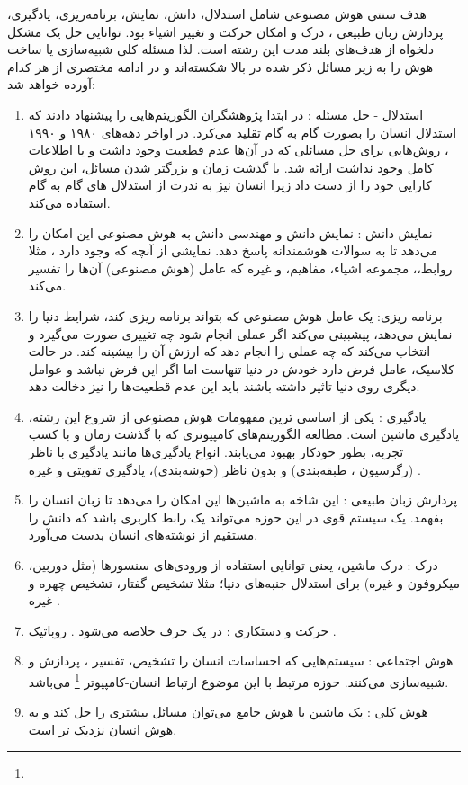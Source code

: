 \documentclass[a4paper, 12pt]{article}
\begin{document}
   
   هدف سنتی هوش مصنوعی شامل استدلال، دانش، نمایش، برنامه‌ریزی، یادگیری، پردازش زبان طبیعی ، درک و امکان حرکت و تغییر اشیاء بود. توانایی حل یک مشکل دلخواه از هدف‌های بلند مدت این رشته است. لذا مسئله کلی شبیه‌سازی یا ساخت هوش را به زیر مسائل ذکر شده در بالا شکسته‌اند و در ادامه مختصری از هر کدام آورده خواهد شد:
   \begin{enumerate}
   	\item
   	استدلال - حل مسئله :
   	در ابتدا پژوهشگران الگوریتم‌هایی را پیشنهاد دادند که استدلال انسان را بصورت گام به گام تقلید می‌کرد. در اواخر دهه‌های ۱۹۸۰ و ۱۹۹۰ ، روش‌هایی برای حل مسائلی که در آن‌ها عدم قطعیت وجود داشت و یا اطلاعات کامل وجود نداشت ارائه شد.  با گذشت زمان و بزرگتر شدن مسائل، این روش کارایی خود را از دست داد زیرا انسان نیز به ندرت از استدلال های گام به گام استفاده می‌کند.
   	\item
   	نمایش دانش :
   	نمایش دانش و مهندسی دانش به هوش مصنوعی این امکان را می‌دهد تا به سوالات هوشمندانه پاسخ دهد. نمایشی از آنچه که وجود دارد ، مثلا روابط،، مجموعه اشیاء، مفاهیم، و غیره که عامل (هوش مصنوعی)  آن‌ها را تفسیر می‌کند. 
   	
   	\item
   	برنامه ریزی:
   	یک عامل هوش مصنوعی که بتواند برنامه ریزی کند، شرایط دنیا را نمایش می‌دهد، پیشبینی می‌کند اگر عملی انجام شود چه تغییری صورت می‌گیرد و انتخاب می‌کند که چه عملی را انجام دهد که ارزش آن را بیشینه کند. در حالت کلاسیک، عامل فرض دارد خودش در دنیا تنهاست اما اگر این فرض نباشد و عوامل دیگری روی دنیا تاثیر داشته باشند باید این عدم قطعیت‌ها را نیز دخالت دهد. 
   	
   	\item
   	یادگیری :
   	یکی از اساسی ترین مفهومات هوش مصنوعی از شروع این رشته، یادگیری ماشین است. مطالعه الگوریتم‌های کامپیوتری که با گذشت زمان و با کسب تجربه، بطور خودکار بهبود می‌یابند. انواع یادگیری‌ها مانند یادگیری با ناظر (رگرسیون ، طبقه‌بندی) و بدون ناظر (خوشه‌بندی)، یادگیری تقویتی و غیره . 
   	
   	\item
   	پردازش زبان طبیعی :
   	این شاخه به ماشین‌ها این امکان را می‌دهد تا زبان انسان را بفهمد. یک سیستم قوی در این حوزه می‌تواند یک رابط کاربری باشد که دانش را مستقیم از نوشته‌های انسان بدست می‌آورد. 
   	\item
   	درک : 
   	درک ماشین، یعنی توانایی استفاده از ورودی‌های سنسور‌ها (مثل دوربین، میکروفون و غیره) برای استدلال جنبه‌های دنیا؛ مثلا تشخیص گفتار، تشخیص چهره و غیره .
   	  \item
   	  حرکت و دستکاری :
   	  در یک حرف خلاصه می‌شود . روباتیک .
   	  \item
   	  هوش اجتماعی :
   	  سیستم‌هایی که احساسات انسان را تشخیص، تفسیر ، پردازش و شبیه‌سازی می‌کنند. حوزه مرتبط با این موضوع ارتباط انسان-کامپیوتر
   	  \footnote{}
   	  می‌باشد. 
   	  \item
   	  هوش کلی :
   	  یک ماشین با هوش جامع می‌توان مسائل بیشتری را حل کند و به هوش انسان نزدیک تر است. 
   	  
   \end{enumerate} 
\end{document}

